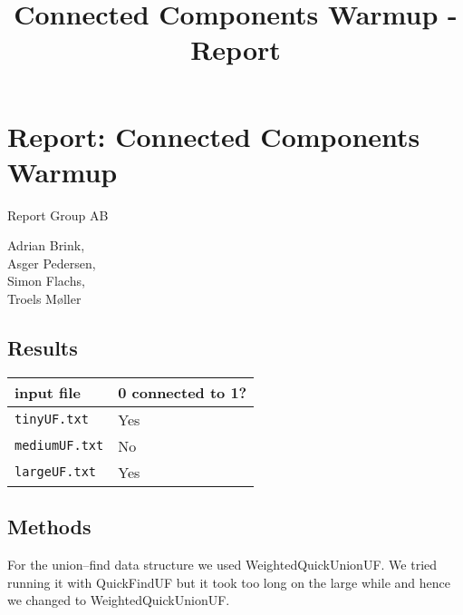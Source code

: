 \documentclass{scrartcl}
\title{Connected Components Warmup - Report}
\begin{document}
\maketitle

\section{Report: Connected Components Warmup}

Report Group AB 

\centering
Adrian Brink,\\
Asger Pedersen,\\
Simon Flachs,\\
Troels M{\o}ller
\justify

\subsection{Results}

\begin{tabular}{ll}
  \toprule
  input file & 0 connected to 1? \\
  \midrule
  {\tt tinyUF.txt} & \qquad Yes \\
  {\tt mediumUF.txt} & \qquad No \\
  {\tt largeUF.txt} & \qquad Yes \\
  \bottomrule
\end{tabular}

\subsection{Methods}

For the union--find data structure we used WeightedQuickUnionUF.
We tried running it with QuickFindUF but it took too long on the large while and hence we changed to WeightedQuickUnionUF.
\end{document}
